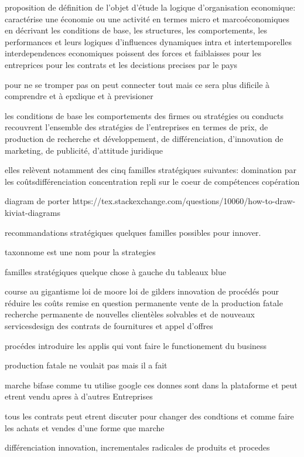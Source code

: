 \documentclass{article}
\begin{document}
proposition de définition de l'objet d'étude
la logique d'organisation economique: caractérise une économie ou une activité en termes micro et marcoéconomiques en décrivant les conditions de base, les structures, les comportements, les performances et leurs logiques d'influences dynamiques intra et intertemporelles
interdependences economiques poissent des forces et faiblaisses pour  les entreprices pour les contrats et les decistions precises par le pays

pour ne se tromper pas on peut connecter tout mais ce sera plus dificile à comprendre et à epxlique et à previsioner

les conditions de base
les comportements des firmes ou stratégies ou conducts recouvrent l'ensemble des stratégies de l'entreprises en termes de prix, de production de recherche et développement, de différenciation, d'innovation de marketing, de publicité, d'attitude juridique

elles relèvent notamment des cinq familles stratégiques suivantes:
    domination par les coûtsdifférenciation
    concentration
    repli sur le coeur de compétences
    copération

diagram de porter
https://tex.stackexchange.com/questions/10060/how-to-draw-kiviat-diagrams


recommandations stratégiques quelques familles possibles pour innover.

taxonnome est une nom pour la strategies

familles stratégiques
quelque chose à gauche du tableaux blue

course au gigantisme
loi de moore loi de gilders
innovation de procédés pour réduire les coûts
remise en question permanente
vente de la production fatale
recherche permanente de nouvelles clientèles solvables et de nouveaux servicesdesign des contrats de fournitures et appel d'offres


procédes introduire les applis qui vont faire le functionement du business

production fatale ne voulait pas mais il a fait 

marche bifase comme tu utilise google ces donnes sont dans la plataforme et peut etrent vendu apres à d'autres Entreprises

tous les contrats peut etrent discuter pour changer des condtions et comme faire les achats et vendes d'une forme que marche

différenciation
innovation, incrementales radicales de produits et procedes
\end{document}
